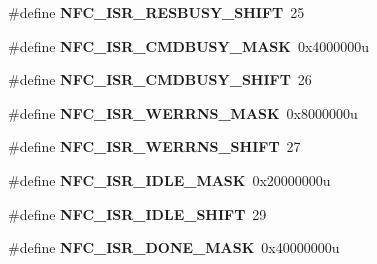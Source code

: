 \begin{DoxyCompactItemize}
\item 
\hypertarget{group___n_f_c___register___masks_ga1d8cfa92e9bddb132cc6cd4fa71c0943}{}\#define {\bfseries N\+F\+C\+\_\+\+I\+S\+R\+\_\+\+R\+E\+S\+B\+U\+S\+Y\+\_\+\+S\+H\+I\+F\+T}~25\label{group___n_f_c___register___masks_ga1d8cfa92e9bddb132cc6cd4fa71c0943}

\item 
\hypertarget{group___n_f_c___register___masks_ga8ac8e213009d8ebda6145f8aa7699ba0}{}\#define {\bfseries N\+F\+C\+\_\+\+I\+S\+R\+\_\+\+C\+M\+D\+B\+U\+S\+Y\+\_\+\+M\+A\+S\+K}~0x4000000u\label{group___n_f_c___register___masks_ga8ac8e213009d8ebda6145f8aa7699ba0}

\item 
\hypertarget{group___n_f_c___register___masks_gad1315c07e95a262e2cfa0697cabb62c6}{}\#define {\bfseries N\+F\+C\+\_\+\+I\+S\+R\+\_\+\+C\+M\+D\+B\+U\+S\+Y\+\_\+\+S\+H\+I\+F\+T}~26\label{group___n_f_c___register___masks_gad1315c07e95a262e2cfa0697cabb62c6}

\item 
\hypertarget{group___n_f_c___register___masks_ga8a72c66a5e9b8fc23cd32e35fb976993}{}\#define {\bfseries N\+F\+C\+\_\+\+I\+S\+R\+\_\+\+W\+E\+R\+R\+N\+S\+\_\+\+M\+A\+S\+K}~0x8000000u\label{group___n_f_c___register___masks_ga8a72c66a5e9b8fc23cd32e35fb976993}

\item 
\hypertarget{group___n_f_c___register___masks_gae1d3166c0896928be8beefe6eb43e9fa}{}\#define {\bfseries N\+F\+C\+\_\+\+I\+S\+R\+\_\+\+W\+E\+R\+R\+N\+S\+\_\+\+S\+H\+I\+F\+T}~27\label{group___n_f_c___register___masks_gae1d3166c0896928be8beefe6eb43e9fa}

\item 
\hypertarget{group___n_f_c___register___masks_ga621efc180593fbb9a3ce1ce8ff28756a}{}\#define {\bfseries N\+F\+C\+\_\+\+I\+S\+R\+\_\+\+I\+D\+L\+E\+\_\+\+M\+A\+S\+K}~0x20000000u\label{group___n_f_c___register___masks_ga621efc180593fbb9a3ce1ce8ff28756a}

\item 
\hypertarget{group___n_f_c___register___masks_ga836bbb42c705a34f652924c1afd3f2be}{}\#define {\bfseries N\+F\+C\+\_\+\+I\+S\+R\+\_\+\+I\+D\+L\+E\+\_\+\+S\+H\+I\+F\+T}~29\label{group___n_f_c___register___masks_ga836bbb42c705a34f652924c1afd3f2be}

\item 
\hypertarget{group___n_f_c___register___masks_ga8db9a26a19a280709f31ad195300f758}{}\#define {\bfseries N\+F\+C\+\_\+\+I\+S\+R\+\_\+\+D\+O\+N\+E\+\_\+\+M\+A\+S\+K}~0x40000000u\label{group___n_f_c___register___masks_ga8db9a26a19a280709f31ad195300f758}


\end{DoxyCompactItemize}

